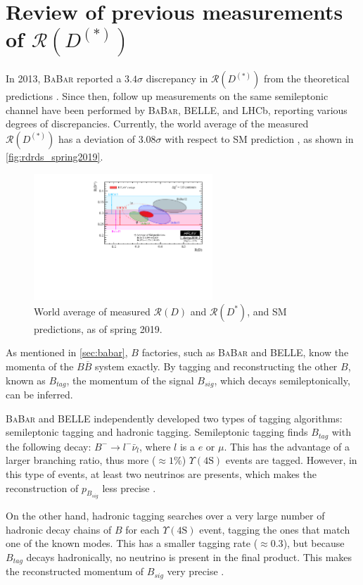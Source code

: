 \documentclass[12pt,letterpaper]{article}
\def\BaBar/{\textsc{BaBar}}
\def\Y4S/{\ensuremath{\Upsilon(\text{4S})}}
\def\RD/{\ensuremath{\mathcal{R}(D)}}
\def\RDst/{\ensuremath{\mathcal{R}(D^{*})}}
\def\RDDst/{\ensuremath{\mathcal{R}(D^{(*)})}}
\begin{document}
\section{Review of previous measurements of \RDDst/}
In 2013, \BaBar/ reported a $3.4\sigma$ discrepancy in \RDDst/ from the
theoretical predictions \cite{Lees:2013rw}.
Since then, follow up measurements on the same semileptonic channel have been
performed by \BaBar/, BELLE, and LHCb, reporting various degrees of
discrepancies.
Currently, the world average of the measured \RDDst/ has a deviation of
$3.08\sigma$ with respect to SM prediction \cite{HFLAV:2019}, as shown
in \autoref{fig:rdrds_spring2019}.

\begin{figure}[ht]
    \centering
    \includegraphics[width=0.6\textwidth]{figs/rdrds_spring2019.pdf}
    \caption{
        World average of measured \RD/ and \RDst/, and SM predictions, as of
        spring 2019.
    }
    \label{fig:rdrds_spring2019}
\end{figure}

As mentioned in \autoref{sec:babar}, $B$ factories, such as \BaBar/ and BELLE,
know the momenta of the $B \overline{B}$ system exactly.
By tagging and reconstructing the other $B$, known as $B_{tag}$, the momentum of
the signal $B_{sig}$, which decays semileptonically, can be inferred.

\BaBar/ and BELLE independently developed two types of tagging algorithms:
semileptonic tagging and hadronic tagging.
Semileptonic tagging finds $B_{tag}$ with the following decay:
$B^- \rightarrow l^- \bar{\nu}_l$, where $l$ is a $e$ or $\mu$.
This has the advantage of a larger branching ratio, thus more ($\approx 1\%$)
\Y4S/ events are tagged.
However, in this type of events, at least two neutrinos are presents, which
makes the reconstruction of $p_{B_{sig}}$ less precise \cite{Ciezarek:2017yzh}.

On the other hand, hadronic tagging searches over a very large number of
hadronic decay chains of $B$ for each \Y4S/ event, tagging the ones that match
one of the known modes.
This has a smaller tagging rate ($\approx 0.3$), but because $B_{tag}$ decays
hadronically, no neutrino is present in the final product.
This makes the reconstructed momentum of $B_{sig}$ very
precise \cite{Lees:2013uzd,Ciezarek:2017yzh}.
\end{document}
